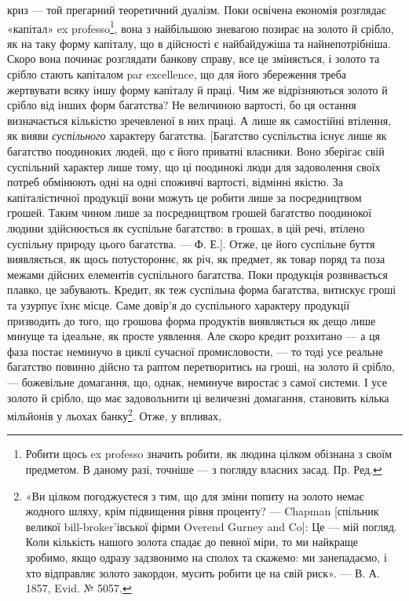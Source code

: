 \parcont{}  %
криз — той прегарний теоретичний дуалізм. Поки освічена економія розглядає
«капітал» ex professo\footnote{Робити щось ex professo значить робити, як людина цілком обізнана з своїм предметом. В даному
разі, точніше — з погляду власних засад. Пр. Ред.}, вона з найбільшою зневагою позирає на золото й срібло,
як на таку форму капіталу, що в дійсності є найбайдужіша та найнепотрібніша.
Скоро вона починає розглядати банкову справу, все це зміняється, і золото та
срібло стають капіталом par excellence, що для його збереження треба жертвувати
всяку іншу форму капіталу й праці. Чим же відрізняються золото й
срібло від інших форм багатства? Не величиною вартості, бо ця остання визначається
кількістю зречевленої в них праці. А лише як самостійні втілення, як вияви
\emph{суспільного} характеру багатства. [Багатство суспільства існує лише як багатство
поодиноких людей, що є його приватні власники. Воно зберігає свій суспільний
характер лише тому, що ці поодинокі люди для задоволення своїх потреб
обмінюють одні на одні споживчі вартості, відмінні якістю. За капіталістичної
продукції вони можуть це робити лише за посредництвом грошей. Таким
чином лише за посредництвом грошей багатство поодинокої людини здійснюється як
суспільне багатство: в грошах, в цій речі, втілено суспільну природу цього багатства.
— Ф. Е.]. Отже, це його суспільне буття виявляється, як щось потустороннє,
як річ, як предмет, як товар поряд та поза межами дійсних елементів суспільного
багатства. Поки продукція розвивається плавко, це забувають. Кредит, як теж
суспільна форма багатства, витискує гроші та узурпує їхнє місце. Саме довір’я
до суспільного характеру продукції призводить до того, що грошова форма продуктів
виявляється як дещо лише минуще та ідеальне, як просте уявлення. Але
скоро кредит розхитано — а ця фаза постає неминучо в циклі сучасної промисловости,
— то тоді усе реальне багатство повинно дійсно та раптом перетворитись
на гроші, на золото й срібло, — божевільне домагання, що, однак, неминуче виростає
з самої системи. І усе золото й срібло, що має задовольнити ці величезні
домагання, становить кілька мільйонів у льохах банку\footnote{
«Ви цілком погоджуєтеся з тим, що для зміни попиту на золото немає жодного шляху, крім
підвищення
рівня проценту? — Chapman [спільник великої bill-broker’івської фірми Overend Gurney and Co]:
Це — мій погляд. Коли кількість нашого золота спадає до певної міри, то ми найкраще зробимо, якщо
одразу задзвонимо на сполох та скажемо: ми занепадаємо, і хто відправляє золото закордон, мусить
робити це на свій риск». — В. А. 1857, Evid. № 5057.
}. Отже, у впливах,
